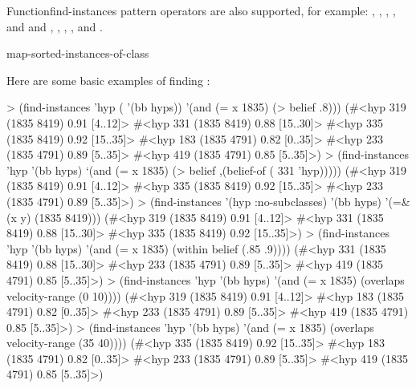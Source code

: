\documentclass[10pt,twoside,english,pdftex]{article}
\begin{document}
\begin{functiondoc}{Function}{find-instances}
 pattern operators are also
supported, for example: \code{=\&}, \code{=\$\&}, \code{=\$}, \code{=\$\$},
and \code{=\$\$\$} and , , ,
, and .

\begin{alsos}{map-sorted-instances-of-class}
\end{alsos}

\fnexamples
{}%
%
%
Here are some basic examples of finding  :
%
\W\supp
\begin{example}
> (find-instances 'hyp ( '(bb hyps)) 
    '(and (= x 1835) (> belief .8)))
(#<hyp 319 (1835 8419) 0.91 [4..12]>
 #<hyp 331 (1835 8419) 0.88 [15..30]>
 #<hyp 335 (1835 8419) 0.92 [15..35]>
 #<hyp 183 (1835 4791) 0.82 [0..35]>
 #<hyp 233 (1835 4791) 0.89 [5..35]>
 #<hyp 419 (1835 4791) 0.85 [5..35]>)\goodpagebreak
> (find-instances 'hyp '(bb hyps)
    `(and (= x 1835) 
          (> belief ,(belief-of ( 331 'hyp)))))
(#<hyp 319 (1835 8419) 0.91 [4..12]>
 #<hyp 335 (1835 8419) 0.92 [15..35]>
 #<hyp 233 (1835 4791) 0.89 [5..35]>)\goodpagebreak
> (find-instances '(hyp :no-subclasses) '(bb hyps)
    '(=\& (x y) (1835 8419)))
(#<hyp 319 (1835 8419) 0.91 [4..12]>
 #<hyp 331 (1835 8419) 0.88 [15..30]>
 #<hyp 335 (1835 8419) 0.92 [15..35]>)\goodpagebreak
> (find-instances 'hyp '(bb hyps) 
    '(and (= x 1835) (within belief (.85 .9))))
(#<hyp 331 (1835 8419) 0.88 [15..30]>
 #<hyp 233 (1835 4791) 0.89 [5..35]>
 #<hyp 419 (1835 4791) 0.85 [5..35]>)\goodpagebreak
> (find-instances 'hyp '(bb hyps) 
    '(and (= x 1835) (overlaps velocity-range (0 10))))
(#<hyp 319 (1835 8419) 0.91 [4..12]>
 #<hyp 183 (1835 4791) 0.82 [0..35]>
 #<hyp 233 (1835 4791) 0.89 [5..35]>
 #<hyp 419 (1835 4791) 0.85 [5..35]>)\goodpagebreak
> (find-instances 'hyp '(bb hyps) 
    '(and (= x 1835) (overlaps velocity-range (35 40))))
(#<hyp 335 (1835 8419) 0.92 [15..35]>
 #<hyp 183 (1835 4791) 0.82 [0..35]>
 #<hyp 233 (1835 4791) 0.89 [5..35]>
 #<hyp 419 (1835 4791) 0.85 [5..35]>)\goodpagebreak

\end{example}
\end{functiondoc}
\end{document}

